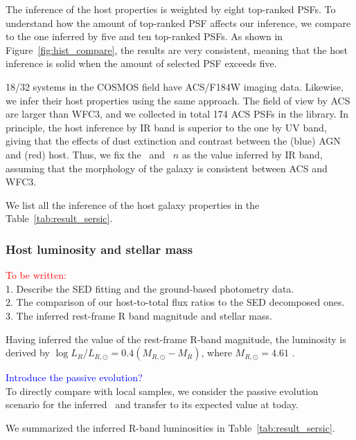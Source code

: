 \documentclass[apj]{emulateapj}
\begin{document}
The inference of the host properties is weighted by eight top-ranked PSFs. To understand how the amount of top-ranked PSF affects our inference, we compare to the one inferred by five and ten top-ranked PSFs. As shown in Figure~\ref{fig:hist_compare}, the results are very consistent, meaning that the host inference is solid when the amount of selected PSF exceeds five.

18/32 systems in the COSMOS field have ACS/F184W imaging data. Likewise, we infer their host properties using the same approach. The field of view by ACS are larger than WFC3, and we collected in total 174 ACS PSFs in the library. In principle, the host inference by IR band is superior to the one by UV band, giving that the effects of dust extinction and contrast between the (blue) AGN and (red) host. Thus, we fix the \Reff\ and \sersic\ $n$ as the value inferred by IR band, assuming that the morphology of the galaxy is consistent between ACS and WFC3.

We list all the inference of the host galaxy properties in the Table~\ref{tab:result_sersic}.

\subsubsection{Host luminosity and stellar mass}
\textcolor{red}{To be written:}
\\1. Describe the SED fitting and the ground-based photometry data.
\\2. The comparison of our host-to-total flux ratios to the SED decomposed ones.
\\3. The inferred rest-frame R band magnitude and stellar mass.

Having inferred the value of the rest-frame R-band magnitude, the luminosity is derived by $\log L_R/L_{R, \odot} = 0.4 (M_{R, \odot}-M_R)$, where $M_{R, \odot}=4.61$ \citep{Blanton07}.

\textcolor{blue}{Introduce the passive evolution?}
\\To directly compare with local samples, we consider the passive evolution scenario for the inferred \lhost\ and transfer to its expected value at today.

We summarized the inferred R-band luminosities in Table~\ref{tab:result_sersic}.
\end{document}
